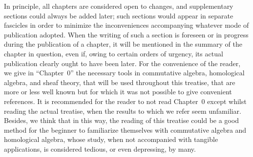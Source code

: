 \bigskip

In principle, all chapters are considered open to changes, and supplementary sections could always be added later;
such sections would appear in separate fascicles in order to minimize the inconveniences accompanying whatever mode of publication adopted.
When the writing of such a section is foreseen or in progress during the publication of a chapter, it will be mentioned in the summary of the chapter in question, even if, owing to certain orders of urgency, its actual publication clearly ought to have been later.
For the convenience of the reader, we give in ``Chapter~0'' the necessary tools in commutative algebra, homological algebra, and sheaf theory, that will be used throughout this treatise, that are more or less well known but for which it was not possible to give convenient references.
It is recommended for the reader to not read Chapter~0 except whilst reading the actual treatise, when the results to which we refer seem unfamiliar.
Besides, we think that in this way, the reading of this treatise could be a good method for the beginner to familiarize themselves with commutative algebra and homological algebra, whose study, when not accompanied with tangible applications, is considered tedious, or even depressing, by many.

\sectionbreak

